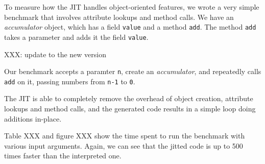 To measure how the JIT handles object-oriented features, we wrote a very
simple benchmark that involves attribute lookups and method calls.  We have an
\emph{accumulator} object, which has a field \lstinline{value} and a method
\lstinline{add}.  The method \lstinline{add} takes a parameter and adds it the
field \lstinline{value}.

XXX: update to the new version

Our benchmark accepts a paramter \lstinline{n}, create an \emph{accumulator},
and repeatedly calls \lstinline{add} on it, passing numbers from
\lstinline{n-1} to \lstinline{0}.

The JIT is able to completely remove the overhead of object creation,
attribute lookups and method calls, and the generated code results in a simple
loop doing additions in-place.

Table XXX and figure XXX show the time spent to run the benchmark with various
input arguments. Again, we can see that the jitted code is up to 500 times
faster than the interpreted one.
